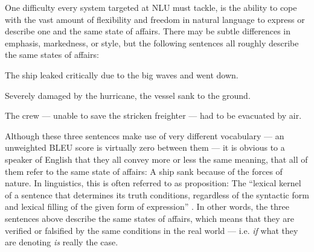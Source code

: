 
One difficulty every system targeted at NLU must tackle, is the ability to cope with the
vast amount of flexibility and freedom in natural language to express or describe
one and the same state of affairs. There may be subtle differences in emphasis,
markedness, or style, but the following sentences all roughly describe the same
states of affairs:

\begin{examples}
  \item The ship leaked critically due to the big waves and went down.
  \item \label{ex:sinking-sent} Severely damaged by the hurricane, the vessel sank to the ground.
  \item The crew --- unable to save the stricken freighter --- had to be evacuated by air.
\end{examples}

Although these three sentences make use of very different vocabulary --- an unweighted BLEU score
is virtually zero between them --- it is obvious to a speaker of English that they all convey more
or less the same meaning, that all of them refer to the same state of affairs: A ship sank because
of the forces of nature. In linguistics, this is often referred to as proposition: The ``lexical
kernel of a sentence that determines its truth conditions, regardless of the syntactic form and
lexical filling of the given form of expression'' \cite[p.~959]{bussmann2006routledge}. In other
words, the three sentences above describe the same states of affairs, which means that they are
verified or falsified by the same conditions in the real world --- i.e. \emph{if} what they are
denoting \emph{is} really the case.

